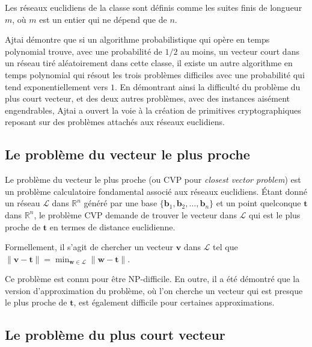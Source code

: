 Les réseaux euclidiens de la classe sont définis comme les suites finis de longueur $m$, où $m$ est un entier qui ne dépend que de $n$.

Ajtai démontre que si un algorithme probabilistique qui opère en temps polynomial trouve, avec une
probabilité de $1/2$ au moins, un vecteur court dans un réseau tiré aléatoirement dans cette classe,
il existe un autre algorithme en temps polynomial qui résout les trois problèmes difficiles avec une
probabilité qui tend exponentiellement vers $1$.
En démontrant ainsi la difficulté du problème du plus court vecteur, et des deux autres problèmes, avec des instances aisément
engendrables, Ajtai a ouvert la voie à la création de primitives cryptographiques reposant sur des
problèmes attachés aux réseaux euclidiens.





\subsection{Le problème du vecteur le plus proche} 
Le problème du vecteur le plus proche (ou CVP pour \emph{closest vector problem}) est un problème calculatoire fondamental associé aux réseaux euclidiens. Étant donné un réseau $\mathcal{L}$ dans $\mathbb{R}^n$ généré par une base $\{\mathbf{b}_1, \mathbf{b}_2, \ldots, \mathbf{b}_n\}$ et un point quelconque $\mathbf{t}$ dans $\mathbb{R}^n$, le problème CVP demande de trouver le vecteur dans $\mathcal{L}$ qui est le plus proche de $\mathbf{t}$ en termes de distance euclidienne.

Formellement, il s’agit de chercher un vecteur $\mathbf{v}$ dans $\mathcal{L}$ tel que $\|\mathbf{v}-\mathbf{t}\| = \min_{\mathbf{w} \in \mathcal{L}} \|\mathbf{w}-\mathbf{t}\|$.

Ce problème est connu pour être NP-difficile. En outre, il a été démontré que la version d'approximation du problème, où l'on cherche un vecteur qui est presque le plus proche de $\mathbf{t}$, est également difficile pour certaines approximations. 

\subsection{Le problème du plus court vecteur}

